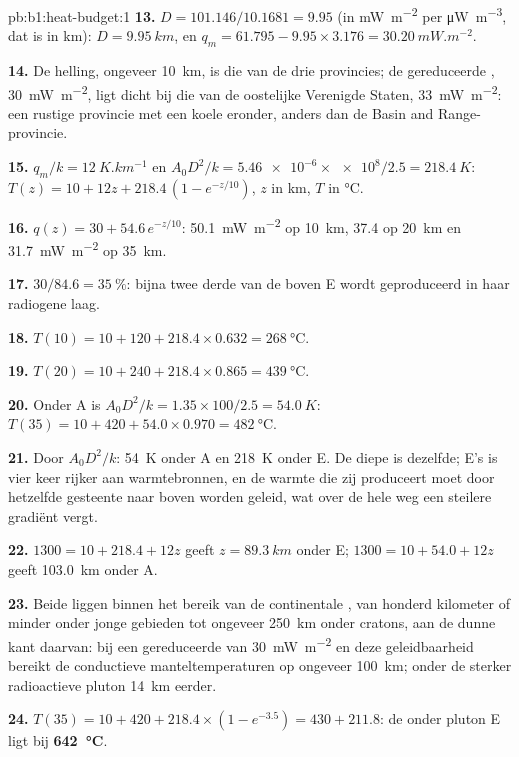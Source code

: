 \begin{solution}{pb:b1:heat-budget:1}
\textbf{13.} $D = 101.146/10.1681 = 9.95$ (in \unit{mW.m^{-2}} per
\unit{\micro W.m^{-3}}, dat is in km): $D = \qty{9.95}{km}$, en $q_m = 61.795 -
9.95\times3.176 = \qty{30.20}{mW.m^{-2}}$.

\textbf{14.} De helling, ongeveer \qty{10}{km}, is die van de drie provincies; de gereduceerde , \qty{30}{mW.m^{-2}}, ligt dicht bij die van de oostelijke Verenigde Staten, \qty{33}{mW.m^{-2}}: een rustige provincie met een koele  eronder, anders dan de Basin and Range-provincie.

\textbf{15.} $q_m/k = \qty{12}{K.km^{-1}}$ en $A_0D^2/k = \num{5.46e-6}\times\num{e8}/2.5
= \qty{218.4}{K}$: $T(z) = 10 + 12z + 218.4\,(1 - e^{-z/10})$, $z$ in km, $T$ in
\unit{\degreeCelsius}.

\textbf{16.} $q(z) = 30 + 54.6\,e^{-z/10}$: \qty{50.1}{mW.m^{-2}} op \qty{10}{km},
\num{37.4} op \qty{20}{km} en \qty{31.7}{mW.m^{-2}} op \qty{35}{km}.

\textbf{17.} $30/84.6 = \qty{35}{\percent}$: bijna twee derde van de 
boven E wordt geproduceerd in haar radiogene laag.

\textbf{18.} $T(10) = 10 + 120 + 218.4\times0.632 = \qty{268}{\degreeCelsius}$.

\textbf{19.} $T(20) = 10 + 240 + 218.4\times0.865 = \qty{439}{\degreeCelsius}$.

\textbf{20.} Onder A is $A_0D^2/k = 1.35\times100/2.5 = \qty{54.0}{K}$:
$T(35) = 10 + 420 + 54.0\times0.970 = \qty{482}{\degreeCelsius}$.

\textbf{21.} Door $A_0D^2/k$: \qty{54}{K} onder A en \qty{218}{K} onder E. De diepe  is dezelfde; E's  is vier keer rijker aan warmtebronnen, en de warmte die zij produceert moet door hetzelfde gesteente naar boven worden geleid, wat over de hele weg een steilere gradiënt vergt.

\textbf{22.} $1300 = 10 + 218.4 + 12z$ geeft $z = \qty{89.3}{km}$ onder E;
$1300 = 10 + 54.0 + 12z$ geeft \qty{103.0}{km} onder A.

\textbf{23.} Beide liggen binnen het bereik van de continentale , van honderd kilometer of minder onder jonge gebieden tot ongeveer \qty{250}{km} onder cratons, aan de dunne kant daarvan: bij een gereduceerde  van \qty{30}{mW.m^{-2}} en deze geleidbaarheid bereikt de conductieve  manteltemperaturen op ongeveer \qty{100}{km}; onder de sterker radioactieve pluton \qty{14}{km} eerder.

\textbf{24.} $T(35) = 10 + 420 + 218.4\times(1 - e^{-3.5}) = 430 + 211.8$: de
 onder pluton E ligt bij
\textbf{\qty[text-series-to-math=true]{642}{\degreeCelsius}}.
\end{solution}
